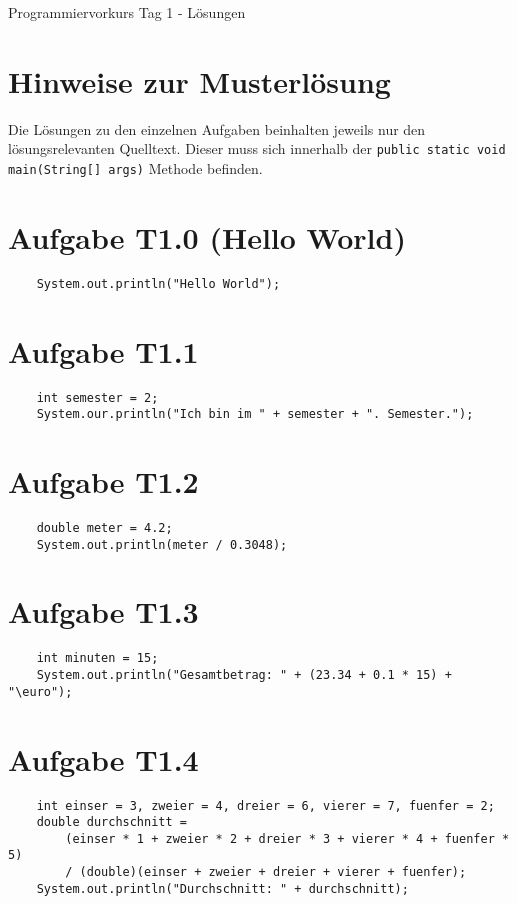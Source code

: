 \documentclass[final,a4paper]{article}
\begin{document}

{\huge Programmiervorkurs Tag 1 - Lösungen}

\bigskip

\section*{Hinweise zur Musterlösung}
Die Lösungen zu den einzelnen Aufgaben beinhalten jeweils nur den lösungsrelevanten Quelltext. Dieser muss sich innerhalb der \texttt{public static void main(String[] args)} Methode befinden.
\section*{Aufgabe T1.0 (Hello World)}
\begin{lstlisting}
	System.out.println("Hello World");
\end{lstlisting}
\section*{Aufgabe T1.1}
\begin{lstlisting}
	int semester = 2;
	System.our.println("Ich bin im " + semester + ". Semester.");
\end{lstlisting}
\section*{Aufgabe T1.2}
\begin{lstlisting}
	double meter = 4.2;
	System.out.println(meter / 0.3048);
\end{lstlisting}
\section*{Aufgabe T1.3}
\begin{lstlisting}
	int minuten = 15;
	System.out.println("Gesamtbetrag: " + (23.34 + 0.1 * 15) + "\euro");
\end{lstlisting}
\section*{Aufgabe T1.4}
\begin{lstlisting}
	int einser = 3, zweier = 4, dreier = 6, vierer = 7, fuenfer = 2;
	double durchschnitt = 
		(einser * 1 + zweier * 2 + dreier * 3 + vierer * 4 + fuenfer * 5)
		/ (double)(einser + zweier + dreier + vierer + fuenfer);
	System.out.println("Durchschnitt: " + durchschnitt);
\end{lstlisting}
\end{document}
